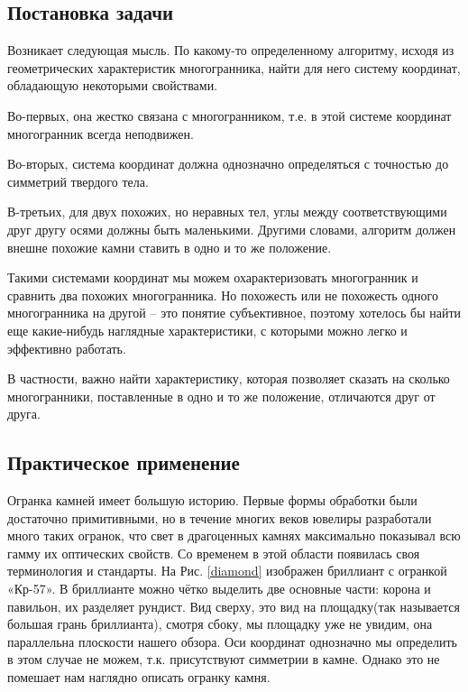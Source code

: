 \documentclass[a4paper,12pt, titlepage]{article}
\begin{document}
\subsection{Постановка задачи}
Возникает следующая мысль. По какому-то определенному алгоритму, исходя из геометрических характеристик 
многогранника, найти для него систему координат, обладающую некоторыми свойствами. 

Во-первых, она жестко связана с многогранником, т.е. в этой системе координат многогранник всегда неподвижен.  

Во-вторых, система координат должна однозначно определяться с точностью до симметрий твердого тела. 

В-третьих, для двух похожих, но неравных тел, углы между соответствующими друг другу осями должны быть маленькими.
Другими словами, алгоритм должен внешне похожие камни ставить в одно и то же положение.

Такими системами координат мы можем охарактеризовать многогранник и сравнить два похожих многогранника. 
Но похожесть или не похожесть одного многогранника на другой -- это понятие субъективное, поэтому хотелось бы 
найти еще какие-нибудь наглядные характеристики, с которыми можно легко и эффективно работать. 

В частности, важно найти характеристику, которая позволяет сказать на сколько многогранники, поставленные в одно и
то же положение, отличаются друг от друга.


\subsection{Практическое применение}  
Огранка камней имеет большую историю. Первые формы обработки были достаточно примитивными, но в течение многих веков ювелиры 
разработали много таких огранок, что свет в драгоценных камнях максимально показывал всю гамму их оптических свойств. Со 
временем в этой области появилась своя терминология и стандарты. На Рис. \ref{diamond} изображен бриллиант с огранкой 
«Кр-57»\cite{Epif}.
В бриллианте можно чётко выделить две основные части: корона и павильон, их разделяет рундист. Вид сверху, это  вид на 
площадку(так называется большая грань бриллианта), смотря сбоку, мы площадку уже не увидим, она параллельна  плоскости нашего 
обзора. Оси координат однозначно мы определить в этом случае не можем, т.к. присутствуют симметрии в камне. Однако это не 
помешает нам наглядно описать огранку камня. 
\end{document}
